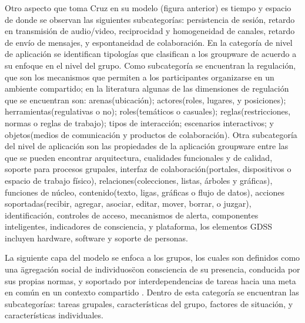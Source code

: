 Otro aspecto que toma Cruz en su modelo (figura anterior) es tiempo y espacio de donde se observan las siguientes subcategor\'ias: persistencia de sesi\'on, retardo en transmisi\'on de audio/video, reciprocidad y homogeneidad de canales, retardo de env\'io de mensajes, y espontaneidad de colaboraci\'on. En la categor\'ia de nivel de aplicaci\'on se identifican tipolog\'ias que clasifican a los groupware de acuerdo a su enfoque en el nivel del grupo. Como subcategor\'ia se encuentran la regulaci\'on, que son los mecanismos que permiten a los participantes organizarse en un ambiente compartido; en la literatura algunas de las dimensiones de regulaci\'on que se encuentran son: arenas(ubicaci\'on); actores(roles, lugares, y posiciones); herramientas(regulativas o no); roles(tem\'aticos o casuales); reglas(restricciones, normas o reglas de trabajo); tipos de interacci\'on; escenarios interactivos; y objetos(medios de comunicaci\'on y productos de colaboraci\'on). Otra subcategor\'ia del nivel de aplicaci\'on son las propiedades de la aplicaci\'on groupware entre las que se pueden encontrar arquitectura, cualidades funcionales y de calidad, soporte para procesos grupales, interfaz de colaboraci\'on(portales, dispositivos o espacio de trabajo f\'isico), relaciones(colecciones, listas, \'arboles y gr\'aficas), funciones de n\'ucleo, contenido(texto, ligas, gr\'aficas o flujo de datos), acciones soportadas(recibir, agregar, asociar, editar, mover, borrar, o juzgar), identificaci\'on, controles de acceso, mecanismos de alerta, componentes inteligentes, indicadores de consciencia, y plataforma, los elementos GDSS incluyen hardware, software y soporte de personas.

La siguiente capa del modelo se enfoca a los grupos, los cuales son definidos como una \"agregaci\'on social de individuos\" con consciencia de su presencia, conducida por sus propias normas, y soportado por interdependencias de tareas hacia una meta en com\'un en un contexto compartido \cite{pumareja2002evolutionary}. Dentro de esta categor\'ia se encuentran las subcategor\'ias: tareas grupales, caracter\'isticas del grupo, factores de situaci\'on, y caracter\'isticas individuales.

